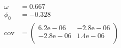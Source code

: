\begin{align}
	\omega &= 0.667 \\
	\phi_0 &= -0.328 \\
	\mathrm{cov} &=
	\begin{pmatrix}
		6.2\mathrm{e}-06 &-2.8\mathrm{e}-06 \\
		-2.8\mathrm{e}-06 &1.4\mathrm{e}-06 \\
	\end{pmatrix} 
\end{align}

